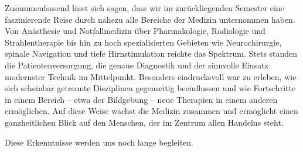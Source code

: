 \documentclass{article}
\begin{document}
Zusammenfassend lässt sich sagen, dass wir im zurückliegenden Semester eine faszinierende Reise durch nahezu alle Bereiche der Medizin unternommen haben. Von Anästhesie und Notfallmedizin über Pharmakologie, Radiologie und Strahlentherapie bis hin zu hoch spezialisierten Gebieten wie Neurochirurgie, spinale Navigation und tiefe Hirnstimulation reichte das Spektrum. Stets standen die Patientenversorgung, die genaue Diagnostik und der sinnvolle Einsatz modernster Technik im Mittelpunkt. Besonders eindrucksvoll war zu erleben, wie sich scheinbar getrennte Disziplinen gegenseitig beeinflussen und wie Fortschritte in einem Bereich – etwa der Bildgebung – neue Therapien in einem anderen ermöglichen. Auf diese Weise wächst die Medizin zusammen und ermöglicht einen ganzheitlichen Blick auf den Menschen, der im Zentrum allen Handelns steht.

Diese Erkenntnisse werden uns noch lange begleiten.
\end{document}
